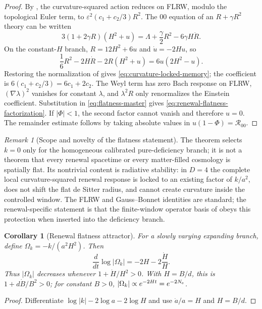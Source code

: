 \documentclass[11pt]{article}
\newtheorem{corollary}[theorem]{Corollary}
\theoremstyle{definition}
\theoremstyle{remark}
\newtheorem{remark}[theorem]{Remark}
\newcommand{\eps}{\varepsilon}
\begin{document}
\begin{proof}
By , the curvature-squared action reduces on
FLRW, modulo the topological Euler term, to
$\eps^2(c_1+c_2/3)R^2$.  The $00$ equation of an $R+\gamma R^2$ theory can be
written
\[
 3(1+2\gamma R)(H^2+u)
 =\Lambda+\frac{\gamma}{2}R^2-6\gamma H\dot R.
\]
On the constant-$H$ branch, $R=12H^2+6u$ and $\dot u=-2Hu$, so
\[
 \frac16R^2-2H\dot R-2R(H^2+u)=6u(2H^2-u).
\]
Restoring the normalization of  gives
\eqref{eq:curvature-locked-memory}; the coefficient is
$6(c_1+c_2/3)=6c_1+2c_2$.  The Weyl term has zero Bach response on FLRW,
$(\nabla\lambda)^2$ vanishes for constant $\lambda$, and
$\lambda^2R$ only renormalizes the Einstein coefficient.  Substitution in
\eqref{eq:flatness-master} gives \eqref{eq:renewal-flatness-factorization}.
If $|\Phi|<1$, the second factor cannot vanish and therefore $u=0$.  The
remainder estimate follows by taking absolute values in
$u(1-\Phi)=\mathcal R_{00}$.
\end{proof}

\begin{remark}[Scope and novelty of the flatness statement]
\label{rem:flatness-scope}
The theorem selects $k=0$ only for the homogeneous calibrated pure-deficiency
branch; it is not a theorem that every renewal spacetime or every matter-filled
cosmology is spatially flat.  Its nontrivial content is radiative stability:
in $D=4$ the complete local curvature-squared renewal response is locked to an
existing factor of $k/a^2$, does not shift the flat de Sitter radius, and cannot
create curvature inside the controlled window.  The FLRW and Gauss--Bonnet
identities are standard; the renewal-specific statement is that the
finite-window operator basis of  obeys this protection when
inserted into the deficiency branch.
\end{remark}

\begin{corollary}[Renewal flatness attractor]
\label{cor:renewal-flatness-attractor}
For a slowly varying expanding branch, define
$\Omega_k=-k/(a^2H^2)$.  Then
\[
 \frac{d}{dt}\log|\Omega_k|=-2H-2\frac{\dot H}{H}.
\]
Thus $|\Omega_k|$ decreases whenever
$1+\dot H/H^2>0$.  With $H=B/d$, this is
$1+d\dot B/B^2>0$; for constant $B>0$,
$|\Omega_k|\propto e^{-2Ht}=e^{-2N_{\rm e}}$.
\end{corollary}

\begin{proof}
Differentiate $\log|k|-2\log a-2\log H$ and use
$\dot a/a=H$ and $H=B/d$.
\end{proof}
\end{document}
